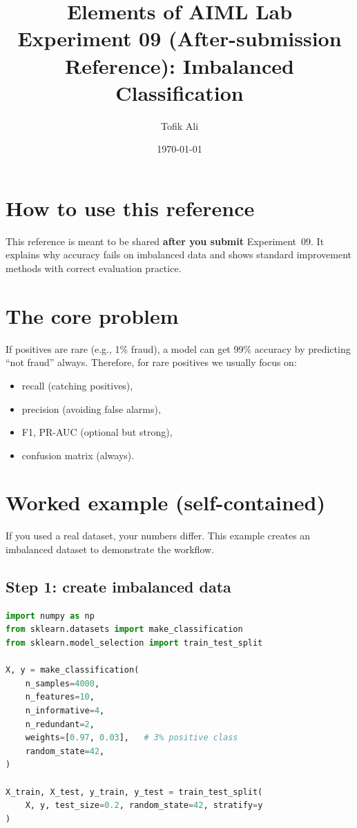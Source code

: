 \documentclass[11pt]{article}
\title{Elements of AIML Lab\\Experiment 09 (After-submission Reference): Imbalanced Classification}
\author{Tofik Ali}
\date{\today}
\begin{document}
\maketitle
\tableofcontents

\section{How to use this reference}
This reference is meant to be shared \textbf{after you submit} Experiment~09.
It explains why accuracy fails on imbalanced data and shows standard improvement methods with correct evaluation practice.

\section{The core problem}
If positives are rare (e.g., 1\% fraud), a model can get 99\% accuracy by predicting ``not fraud'' always.
Therefore, for rare positives we usually focus on:
\begin{itemize}[leftmargin=*]
  \item recall (catching positives),
  \item precision (avoiding false alarms),
  \item F1, PR-AUC (optional but strong),
  \item confusion matrix (always).
\end{itemize}

\section{Worked example (self-contained)}
If you used a real dataset, your numbers differ. This example creates an imbalanced dataset to demonstrate the workflow.

\subsection{Step 1: create imbalanced data}
\begin{lstlisting}[language=Python]
import numpy as np
from sklearn.datasets import make_classification
from sklearn.model_selection import train_test_split

X, y = make_classification(
    n_samples=4000,
    n_features=10,
    n_informative=4,
    n_redundant=2,
    weights=[0.97, 0.03],   # 3% positive class
    random_state=42,
)

X_train, X_test, y_train, y_test = train_test_split(
    X, y, test_size=0.2, random_state=42, stratify=y
)
\end{lstlisting}
\end{document}
